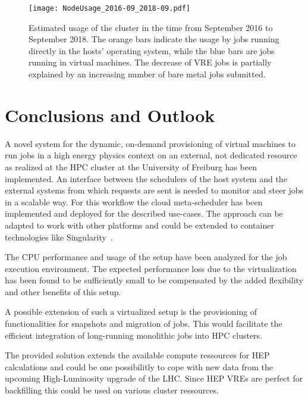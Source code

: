 \begin{figure}
\begin{center}
  \texttt{[image: NodeUsage\_2016-09\_2018-09.pdf]}
  \caption{Estimated usage of the \NEMO cluster in the time from September 2016
    to September 2018. The orange bars indicate the usage by jobs
    running directly in the hosts' operating system, while the blue bars are jobs
    running in virtual machines. The decrease of VRE jobs is partially explained
    by an increasing number of bare metal jobs submitted.}
  \label{fig-nodeusage}
\end{center}
\end{figure}

\section{Conclusions and Outlook}








A novel system for the dynamic, on-demand provisioning of virtual machines to run jobs
in a high energy physics context on an external, not dedicated resource as
realized at the HPC cluster \NEMO at the University of Freiburg has been
implemented. An interface between the schedulers of the
host system and the external systems from which requests are sent is needed to
monitor and steer jobs in a scalable way. For this workflow the cloud meta-scheduler \Roced
has been implemented and deployed for the described use-cases.
The approach can be adapted to work with other platforms and could be extended to
container technologies like Singularity~\cite{VRE2017}.

The CPU performance and usage of the setup have been analyzed for the job execution environment.
The expected performance loss due to the virtualization has been found to be
sufficiently small to be compensated by the added flexibility and other benefits
of this setup.

A possible extension of such a virtualized setup is the provisioning of functionalities
for snapshots and migration of jobs. This would facilitate the efficient integration of
long-running monolithic jobs into HPC clusters.

The provided solution extends the available compute ressources for HEP calculations
and could be one possibilitly to cope with new data from the upcoming High-Luminosity
upgrade of the LHC. Since HEP VREs are perfect for backfilling this could be used on various
cluster ressources.










